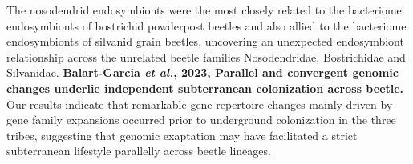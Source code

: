 \documentclass[11pt]{article}
\begin{document}
\begin{sloppypar}
The nosodendrid endosymbionts were the most closely related to the bacteriome endosymbionts of bostrichid powderpost beetles and also allied to the bacteriome endosymbionts of silvanid grain beetles, uncovering an unexpected endosymbiont relationship across the unrelated beetle families Nosodendridae, Bostrichidae and Silvanidae.
\textbf{Balart-Garcia \textit{et al.}, 2023, Parallel and convergent genomic changes underlie independent subterranean colonization across beetle.} \newline
Our results indicate that remarkable gene repertoire changes mainly driven by gene family expansions occurred prior to underground colonization in the three tribes, suggesting that genomic exaptation may have facilitated a strict subterranean lifestyle parallelly across beetle lineages.
\par


\end{sloppypar}
\end{document}
